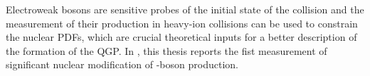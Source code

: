Electroweak bosons are sensitive probes of the initial state of the collision and the measurement of their production in heavy-ion collisions can be used to constrain the nuclear PDFs, which are crucial theoretical inputs for a better description of the formation of the QGP. In , this thesis reports the fist  measurement of significant nuclear modification of \Wb-boson production.

